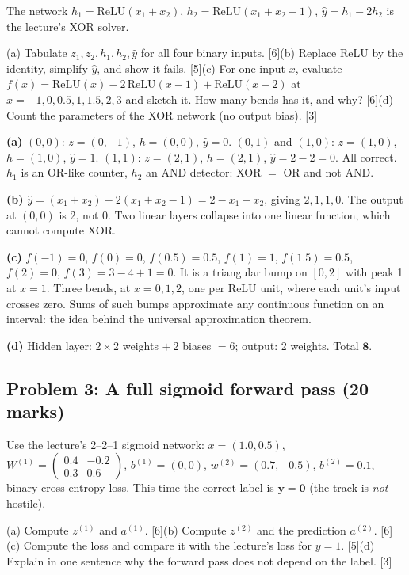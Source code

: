 \documentclass[11pt]{article}
\begin{document}
\begin{prob}The network $h_1=\text{ReLU}(x_1+x_2)$, $h_2=\text{ReLU}(x_1+x_2-1)$, $\hat y=h_1-2h_2$ is the lecture's XOR solver.

(a) Tabulate $z_1,z_2,h_1,h_2,\hat y$ for all four binary inputs. [6]\newline (b) Replace ReLU by the identity, simplify $\hat y$, and show it fails. [5]\newline (c) For one input $x$, evaluate $f(x)=\text{ReLU}(x)-2\,\text{ReLU}(x-1)+\text{ReLU}(x-2)$ at $x=-1,0,0.5,1,1.5,2,3$ and sketch it. How many bends has it, and why? [6]\newline (d) Count the parameters of the XOR network (no output bias). [3]\end{prob}

\begin{soln}\textbf{(a)} $(0,0)$: $z=(0,-1)$, $h=(0,0)$, $\hat y=0$. $(0,1)$ and $(1,0)$: $z=(1,0)$, $h=(1,0)$, $\hat y=1$. $(1,1)$: $z=(2,1)$, $h=(2,1)$, $\hat y=2-2=0$. All correct. $h_1$ is an OR-like counter, $h_2$ an AND detector: XOR $=$ OR and not AND.

\textbf{(b)} $\hat y=(x_1+x_2)-2(x_1+x_2-1)=2-x_1-x_2$, giving $2,1,1,0$. The output at $(0,0)$ is 2, not 0. Two linear layers collapse into one linear function, which cannot compute XOR.

\textbf{(c)} $f(-1)=0$, $f(0)=0$, $f(0.5)=0.5$, $f(1)=1$, $f(1.5)=0.5$, $f(2)=0$, $f(3)=3-4+1=0$. It is a triangular bump on $[0,2]$ with peak 1 at $x=1$. Three bends, at $x=0,1,2$, one per ReLU unit, where each unit's input crosses zero. Sums of such bumps approximate any continuous function on an interval: the idea behind the universal approximation theorem.

\textbf{(d)} Hidden layer: $2\times2$ weights $+\ 2$ biases $=6$; output: 2 weights. Total $\mathbf{8}$.\end{soln}

\subsection{Problem 3: A full sigmoid forward pass \normalfont\small\color{GreyN}(20 marks)}

\begin{prob}Use the lecture's 2--2--1 sigmoid network: $x=(1.0,0.5)$, $W^{(1)}=\begin{pmatrix}0.4&-0.2\\0.3&0.6\end{pmatrix}$, $b^{(1)}=(0,0)$, $w^{(2)}=(0.7,-0.5)$, $b^{(2)}=0.1$, binary cross-entropy loss. This time the correct label is $\mathbf{y=0}$ (the track is \textit{not} hostile).

(a) Compute $z^{(1)}$ and $a^{(1)}$. [6]\newline (b) Compute $z^{(2)}$ and the prediction $a^{(2)}$. [6]\newline (c) Compute the loss and compare it with the lecture's loss for $y=1$. [5]\newline (d) Explain in one sentence why the forward pass does not depend on the label. [3]\end{prob}
\end{document}
